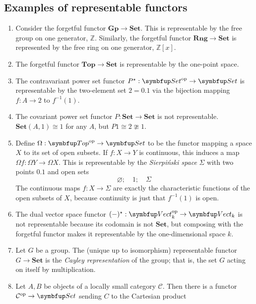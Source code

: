 \subsection{Examples of representable functors}
\begin{enumerate}
    \item Consider the forgetful functor \( \mathbf{Gp} \to \mathbf{Set} \).
    This is representable by the free group on one generator, \( \mathbb Z \).
    Similarly, the forgetful functor \( \mathbf{Rng} \to \mathbf{Set} \) is represented by the free ring on one generator, \( \mathbb Z[x] \).
    \item The forgetful functor \( \mathbf{Top} \to \mathbf{Set} \) is representable by the one-point space.
    \item The contravariant power set functor \( P^\star : \mathbf{Set}^\cop \to \mathbf{Set} \) is representable by the two-element set \( 2 = \qty{0, 1} \) via the bijection mapping \( f : A \to 2 \) to \( f^{-1}(1) \).
    \item The covariant power set functor \( P : \mathbf{Set} \to \mathbf{Set} \) is not representable.
    \( \mathbf{Set}(A, 1) \cong 1 \) for any \( A \), but \( P 1 \cong 2 \ncong 1 \).
    \item Define \( \Omega : \mathbf{Top}^\cop \to \mathbf{Set} \) to be the functor mapping a space \( X \) to its set of open subsets.
    If \( f : X \to Y \) is continuous, this induces a map \( \Omega f : \Omega Y \to \Omega X \).
    This is representable by the \emph{Sierpi\'nski space} \( \Sigma \) with two points \( \qty{0, 1} \) and open sets
    \[ \varnothing;\quad \qty{1};\quad \Sigma \]
    The continuous maps \( f : X \to \Sigma \) are exactly the characteristic functions of the open subsets of \( X \), because continuity is just that \( f^{-1}(\qty{1}) \) is open.
    \item The dual vector space functor \( (-)^\star : \mathbf{Vect}_k^\cop \to \mathbf{Vect}_k \) is not representable because its codomain is not \( \mathbf{Set} \), but composing with the forgetful functor makes it representable by the one-dimensional space \( k \).
    \item Let \( G \) be a group.
    The (unique up to isomorphism) representable functor \( G \to \mathbf{Set} \) is the \emph{Cayley representation} of the group; that is, the set \( G \) acting on itself by multiplication.
    \item Let \( A, B \) be objects of a locally small category \( \mathcal C \).
    Then there is a functor \( \mathcal C^\cop \to \mathbf{Set} \) sending \( C \) to the Cartesian product

\end{enumerate}
